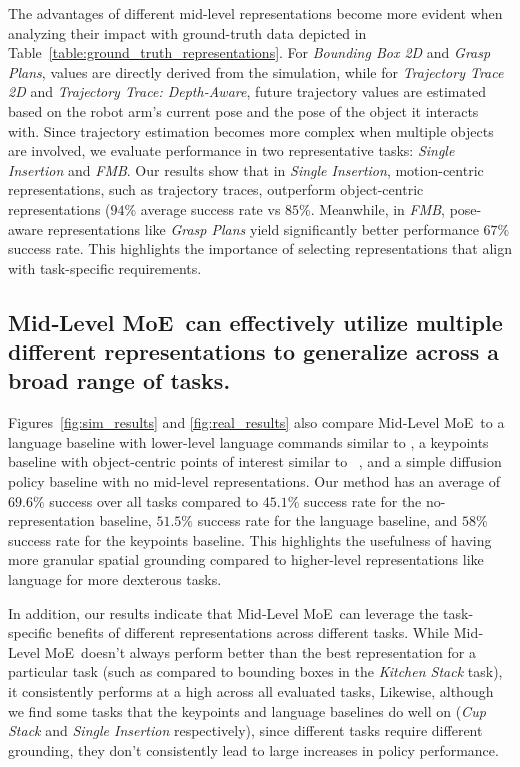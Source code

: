 \documentclass[conference,dvipsnames]{IEEEtran}
\newcommand{\MethodName}{Mid‐Level MoE}
\begin{document}
The advantages of different mid-level representations become more evident when analyzing their impact with ground-truth data depicted in Table~\ref{table:ground_truth_representations}. For \textit{Bounding Box 2D} and \textit{Grasp Plans}, values are directly derived from the simulation, while for \textit{Trajectory Trace 2D} and \textit{Trajectory Trace: Depth-Aware}, future trajectory values are estimated based on the robot arm's current pose and the pose of the object it interacts with. Since trajectory estimation becomes more complex when multiple objects are involved, we evaluate performance in two representative tasks: \textit{Single Insertion} and \textit{FMB}. Our results show that in \textit{Single Insertion}, motion-centric representations, such as trajectory traces, outperform object-centric representations ($94\%$ average success rate vs $85\%$. Meanwhile, in \textit{FMB}, pose-aware representations like \textit{Grasp Plans} yield significantly better performance $67\%$ success rate. This highlights the importance of selecting representations that align with task-specific requirements.

\subsection{\MethodName~can effectively utilize multiple different representations to generalize across a broad range of tasks.}
Figures~\ref{fig:sim_results} and \ref{fig:real_results} also compare \MethodName~to a language baseline with lower-level language commands similar to \cite{belkhale2024rthactionhierarchiesusing}, a keypoints baseline with object-centric points of interest similar to ~\cite{liu2024mokaopenworldroboticmanipulation}, and a simple diffusion policy baseline with no mid-level representations. Our method has an average of $69.6\%$ success over all tasks compared to $45.1\%$ success rate for the no-representation baseline, $51.5\%$ success rate for the language baseline, and $58\%$ success rate for the keypoints baseline. This highlights the usefulness of having more granular spatial grounding compared to higher-level representations like language for more dexterous tasks. 

In addition, our results indicate that \MethodName~can leverage the task-specific benefits of different representations across different tasks. While \MethodName~doesn't always perform better than the best representation for a particular task (such as compared to bounding boxes in the \textit{Kitchen Stack} task), it consistently performs at a high across all evaluated tasks, Likewise, although we find some tasks that the keypoints and language baselines do well on (\textit{Cup Stack} and \textit{Single Insertion} respectively), since different tasks require different grounding, they don't consistently lead to large increases in policy performance.
\end{document}

